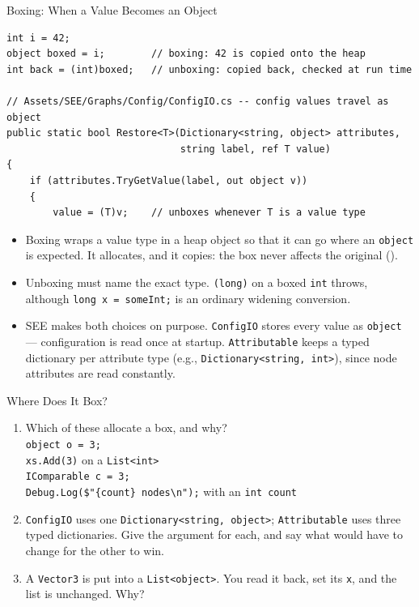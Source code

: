 \begin{frame}[fragile]{Boxing: When a Value Becomes an Object}
  \begin{lstlisting}[basicstyle=\scriptsize\ttfamily]
int i = 42;
object boxed = i;        // boxing: 42 is copied onto the heap
int back = (int)boxed;   // unboxing: copied back, checked at run time

// Assets/SEE/Graphs/Config/ConfigIO.cs -- config values travel as object
public static bool Restore<T>(Dictionary<string, object> attributes,
                              string label, ref T value)
{
    if (attributes.TryGetValue(label, out object v))
    {
        value = (T)v;    // unboxes whenever T is a value type
  \end{lstlisting}
  \vspace{1ex}

  \begin{itemize}
    \item Boxing wraps a value type in a heap object so that it can go where
      an \texttt{object} is expected. It allocates, and it copies: the box
      never affects the original ().
    \item Unboxing must name the exact type. \texttt{(long)} on a boxed
      \texttt{int} throws, although \texttt{long x = someInt;} is an ordinary
      widening conversion.
    \item SEE makes both choices on purpose. \texttt{ConfigIO} stores every
      value as \texttt{object} --- configuration is read once at startup.
      \texttt{Attributable} keeps a typed dictionary per attribute type (e.g., \texttt{Dictionary<string, int>}), since
      node attributes are read constantly.
  \end{itemize}
\end{frame}

\begin{exerciseframe}{Where Does It Box?}
  \begin{enumerate}
    \item Which of these allocate a box, and why?\\
      \texttt{object o = 3;} \quad\\
      \texttt{xs.Add(3)} on a \texttt{List<int>} \quad\\
      \texttt{IComparable c = 3;} \quad\\
      \texttt{Debug.Log(\$"\{count\} nodes\textbackslash n");} with an
      \texttt{int count}
    \item \texttt{ConfigIO} uses one \texttt{Dictionary<string, object>};
      \texttt{Attributable} uses three typed dictionaries. Give the argument
      for each, and say what would have to change for the other to win.
    \item A \texttt{Vector3} is put into a \texttt{List<object>}. You read it
      back, set its \texttt{x}, and the list is unchanged. Why?
  \end{enumerate}
\end{exerciseframe}

